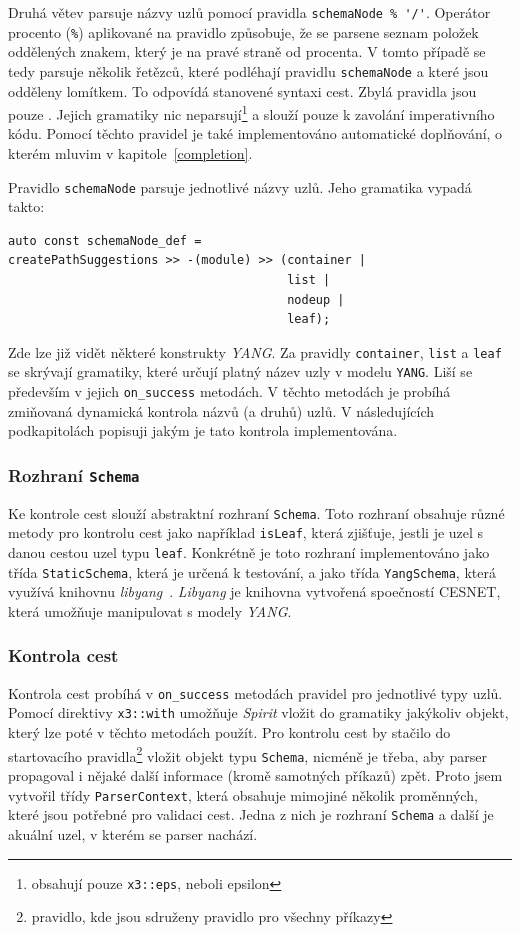 \documentclass[thesis=B,czech,hidelinks]{FITthesis}[2019/03/06]
\begin{document}
Druhá větev parsuje názvy uzlů pomocí pravidla \verb¨schemaNode % '/'¨. Operátor procento (\texttt{\%}) aplikované na pravidlo způsobuje, že se parsene seznam položek oddělených znakem, který je na pravé straně od procenta. V tomto případě se tedy parsuje několik řetězců, které podléhají pravidlu \texttt{schemaNode} a které jsou odděleny lomítkem. To odpovídá stanovené syntaxi cest. Zbylá pravidla jsou pouze . Jejich gramatiky nic neparsují\footnote{obsahují pouze \texttt{x3::eps}, neboli epsilon} a slouží pouze k zavolání imperativního kódu. Pomocí těchto pravidel je také implementováno automatické doplňování, o kterém mluvim v kapitole~\ref{completion}.

Pravidlo \texttt{schemaNode} parsuje jednotlivé názvy uzlů. Jeho gramatika vypadá takto:
\begin{verbatim}
auto const schemaNode_def =
createPathSuggestions >> -(module) >> (container |
                                       list |
                                       nodeup |
                                       leaf);
\end{verbatim}
Zde lze již vidět některé konstrukty \textit{YANG}. Za pravidly \texttt{container}, \texttt{list} a \texttt{leaf} se skrývají gramatiky, které určují platný název uzly v modelu \texttt{YANG}. Liší se především v jejich \verb¨on_success¨ metodách. V těchto metodách je probíhá zmiňovaná dynamická kontrola názvů (a druhů) uzlů. V následujících podkapitolách popisuji jakým je tato kontrola implementována.

\subsubsection{Rozhraní \texttt{Schema}}
Ke kontrole cest slouží abstraktní rozhraní \texttt{Schema}. Toto rozhraní obsahuje různé metody pro kontrolu cest jako například \texttt{isLeaf}, která zjišťuje, jestli je uzel s danou cestou uzel typu \texttt{leaf}. Konkrétně je toto rozhraní implementováno jako třída \texttt{StaticSchema}, která je určená k testování, a jako třída \texttt{YangSchema}, která využívá knihovnu \textit{libyang}~\cite{libyang}. \textit{Libyang} je knihovna vytvořená spoečností CESNET, která umožňuje manipulovat s modely \textit{YANG}.

\subsubsection{Kontrola cest}
Kontrola cest probíhá v \verb¨on_success¨ metodách pravidel pro jednotlivé typy uzlů. Pomocí direktivy \texttt{x3::with} umožňuje \textit{Spirit} vložit do gramatiky jakýkoliv objekt, který lze poté v těchto metodách použít. Pro kontrolu cest by stačilo do startovacího pravidla\footnote{pravidlo, kde jsou sdruženy pravidlo pro všechny příkazy} vložit objekt typu \texttt{Schema}, nicméně je třeba, aby parser propagoval i nějaké další informace (kromě samotných příkazů) zpět. Proto jsem vytvořil třídy \texttt{ParserContext}, která obsahuje mimojiné několik proměnných, které jsou potřebné pro validaci cest. Jedna z nich je rozhraní \texttt{Schema} a další je akuální uzel, v kterém se parser nachází.
\end{document}
